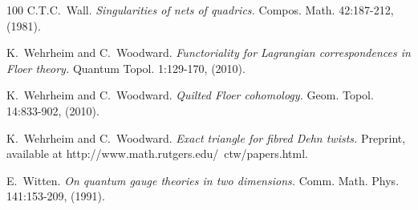 \documentclass[reqno,10pt]{amsart}
\numberwithin{equation}{section}
\theoremstyle{remark}
\begin{document}
\begin{thebibliography}{100}
C.T.C.~Wall.
\emph{Singularities of nets of quadrics.}
Compos. Math. 42:187-212, (1981).

K.~Wehrheim and C.~Woodward.
\emph{Functoriality for Lagrangian correspondences in Floer theory.}
Quantum Topol. 1:129-170, (2010).

K.~Wehrheim and C.~Woodward.
\emph{Quilted Floer cohomology.}
Geom. Topol. 14:833-902, (2010).

K.~Wehrheim and C.~Woodward.
\emph{Exact triangle for fibred Dehn twists.}
Preprint, available at http://www.math.rutgers.edu/~ctw/papers.html.

E.~Witten.
\emph{On quantum gauge theories in two dimensions.}
Comm. Math. Phys. 141:153-209, (1991).

\end{thebibliography}
\end{document}
